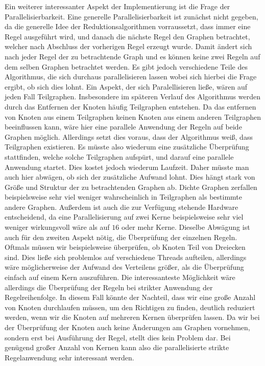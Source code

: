 \documentclass[12pt,onecolumn, notitlepage]{scrartcl}
\begin{document}
Ein weiterer interessanter Aspekt der Implementierung ist die Frage der Parallelisierbarkeit. Eine generelle Parallelisierbarkeit ist zunächst nicht gegeben, da die generelle Idee der Reduktionsalgorithmen vorraussetzt, dass immer eine Regel ausgeführt wird, und danach die nächste Regel den Graphen betrachtet, welcher nach Abschluss der vorherigen Regel erzeugt wurde. Damit ändert sich nach jeder Regel der zu betrachtende Graph und es können keine zwei Regeln auf dem selben Graphen betrachtet werden. Es gibt jedoch verschiedene Teile des Algorithmus, die sich durchaus parallelisieren lassen wobei sich hierbei die Frage ergibt, ob sich dies lohnt. \newline
Ein Aspekt, der sich Paralellisieren ließe, wären auf jeden Fall Teilgraphen. Insbesondere im späteren Verlauf des Algorithmus werden durch das Entfernen der Knoten häufig Teilgraphen entstehen. Da das entfernen von Knoten aus einem Teilgraphen keinen Knoten aus einem anderen Teilgraphen beeinflussen kann, wäre hier eine parallele Anwendung der Regeln auf beide Graphen möglich. Allerdings setzt dies voraus, dass der Algorithmus weiß, dass Teilgraphen existieren. Es müsste also wiederum eine zusätzliche Überprüfung stattfinden, welche solche Teilgraphen aufspürt, und darauf eine parallele Anwendung startet. Dies kostet jedoch wiederum Laufzeit. Daher müsste man auch hier abwägen, ob sich der zusätzliche Aufwand lohnt. Dies hängt stark von Größe und Struktur der zu betrachtenden Graphen ab. Dichte Graphen zerfallen beispielsweise sehr viel weniger wahrscheinlich in Teilgraphen als bestimmte andere Graphen. Außerdem ist auch die zur Verfügung stehende Hardware entscheidend, da eine Parallelisierung auf zwei Kerne beispielsweise sehr viel weniger wirkungsvoll wäre als auf $16$ oder mehr Kerne.\newline
Dieselbe Abwägung ist auch für den zweiten Aspekt nötig, die Überprüfung der einzelnen Regeln. Oftmals müssen wir beispielsweise überprüfen, ob Knoten Teil von Dreiecken sind. Dies ließe sich problemlos auf verschiedene Threads aufteilen, allerdings wäre möglicherweise der Aufwand des Verteilens größer, als die Überprüfung einfach auf einem Kern auszuführen.\newline
Die interessanteste Möglichkeit wäre allerdings die Überprüfung der Regeln bei strikter Anwendung der Regelreihenfolge. In diesem Fall könnte der Nachteil, dass wir eine große Anzahl von Knoten durchlaufen müssen, um den Richtigen zu finden, deutlich reduziert werden, wenn wir die Knoten auf mehreren Kernen überprüfen lassen. Da wir bei der Überprüfung der Knoten auch keine Änderungen am Graphen vornehmen, sondern erst bei Ausführung der Regel, stellt dies kein Problem dar. Bei genügend großer Anzahl von Kernen kann also die parallelisierte strikte Regelanwendung sehr interessant werden.
\end{document}
